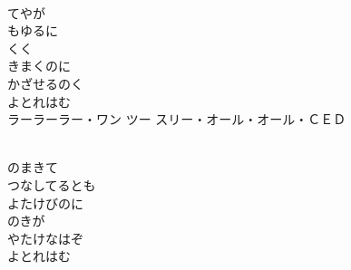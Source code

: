 \documentclass[10pt,b5j]{tarticle} %
\begin{document}
\vspace{1.5em} %
\newcommand{\linespace}{0.5em} %
\newcommand{\blocksize}{0.5\hsize} %
\newcommand{\itemmargin}{3em} %
\begin{enumerate} %
    \setlength{\itemindent}{\itemmargin} %
    \begin{minipage}[c]{\blocksize}
    
        \vspace{\linespace}
        \item~\\
        てやが\\
        もゆるに\\
        くく\\
        きまくのに\\
        かざせるのく\\
        よとれはむ\\
        ラーラーラー・ワン ツー スリー・オール・オール・ＣＥＤ
        
    \end{minipage}
    \begin{minipage}[c]{\blocksize}
        
        \vspace{\linespace}
        \item~\\
        のまきて\\
        つなしてるとも\\
        よたけびのに\\
        のきが\\
        やたけなはぞ\\
        よとれはむ
        
    \end{minipage}
    \begin{minipage}[c]{\blocksize}
        

\end{minipage}
\end{enumerate}
\end{document}
